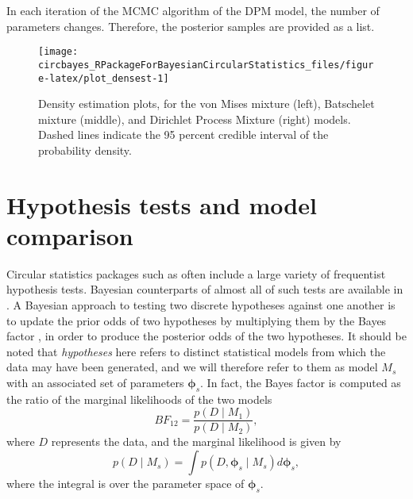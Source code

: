 In each iteration of the MCMC algorithm of the DPM model, the number of
parameters changes. Therefore, the posterior samples are provided as a
list.

\begin{CodeChunk}
\begin{figure}

{\centering \texttt{[image: circbayes\_RPackageForBayesianCircularStatistics\_files/figure-latex/plot\_densest-1]} 

}

\caption[Density estimation plots, for the von Mises mixture (left), Batschelet mixture (middle), and Dirichlet Process Mixture (right) models]{Density estimation plots, for the von Mises mixture (left), Batschelet mixture (middle), and Dirichlet Process Mixture (right) models. Dashed lines indicate the 95 percent credible interval of the probability density.}\label{fig:plot_densest}
\end{figure}
\end{CodeChunk}

\hypertarget{hypothesis-tests-and-model-comparison}{%
\section{Hypothesis tests and model
comparison}\label{hypothesis-tests-and-model-comparison}}

\label{hyptest}

Circular statistics packages such as  often include a
large variety of frequentist hypothesis tests. Bayesian counterparts of
almost all of such tests are available in . A Bayesian
approach to testing two discrete hypotheses against one another is to
update the prior odds of two hypotheses by multiplying them by the Bayes
factor \citep{kass1995bayes, jeffreys1961theory}, in order to produce
the posterior odds of the two hypotheses. It should be noted that
\textit{hypotheses} here refers to distinct statistical models from
which the data may have been generated, and we will therefore refer to
them as model \(M_s\) with an associated set of parameters
\(\boldsymbol{\phi}_s\). In fact, the Bayes factor is computed as the
ratio of the marginal likelihoods of the two models \begin{equation}
BF_{12} = \frac{p(D \mid M_1)}{p(D \mid M_2)},
\end{equation} where \(D\) represents the data, and the marginal
likelihood is given by \begin{equation} \label{eqnjss:marglik}
p(D \mid M_s) = \int p(D, \boldsymbol{\phi}_s \mid M_s) d \boldsymbol{\phi}_s,
\end{equation} where the integral is over the parameter space of
\(\boldsymbol{\phi}_s.\)

